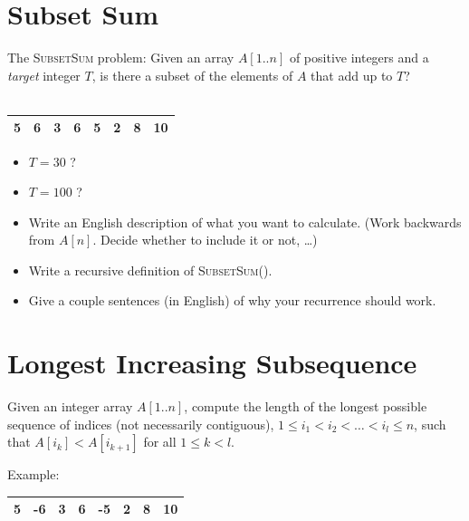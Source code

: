 \documentclass[12pt]{article}
\begin{document}
\clearpage

\section{Subset Sum}

The \textsc{SubsetSum} problem: Given an array $A[1..n]$ of positive integers and a \emph{target} integer $T$, is there a subset of the elements of $A$ that add up to $T$?\\~

\begin{minipage}{1.0\textwidth}\centering
  \begin{tabular}{|*{8}{c|}}
      \hline
      5 & 6 & 3 & 6 & 5 & 2 & 8 & 10 \\
      \hline
    \end{tabular}
  \end{minipage}%


\begin{itemize}
  \item $T = 30$ ? 
  \item $T = 100$ ?
  
  \item Write an English description of what you want to calculate. (Work backwards from $A[n]$. Decide whether to include it or not, \ldots)
  \vspace{1in}
  \item Write a recursive definition of \textsc{SubsetSum}().
  \vspace{2in}
  \item Give a couple sentences (in English) of why your recurrence should work.
  \vspace{2in}
\end{itemize}


\clearpage

\section{Longest Increasing Subsequence}

Given an integer array $A[1..n]$, compute the length of the longest possible sequence of indices (not necessarily contiguous), $1 \leq i_1 < i_2 < \ldots < i_l \leq n$, such that $A[i_k] < A[i_{k+1}]$ for all $1 \leq k < l$.

Example:

\begin{minipage}{1.0\textwidth}\centering
  \begin{tabular}{|*{8}{c|}}
      \hline
      5 & -6 & 3 & 6 & -5 & 2 & 8 & 10 \\
      \hline
    \end{tabular}
  \end{minipage}%
\end{document}
